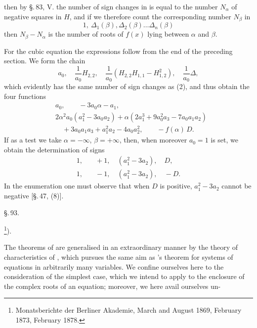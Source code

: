 
then by \S.\,83, V. the number of sign changes in
is equal to the number $N_\alpha$ of negative squares in $H$, and if we therefore count the corresponding number $N_\beta$ in
\[
1,\ \varDelta_1(\beta), \varDelta_2(\beta) \dots \varDelta_n(\beta)
\]
then $N_\beta - N_\alpha$ is the number of roots of $f(x)$ lying between $\alpha$ and $\beta$.

For the cubic equation the expressions follow from the end of the preceding section. We form the chain
\[
a_0,\quad \frac{1}{a_0} H_{2,2},\quad \frac{1}{a_0}\left(H_{2,2} H_{1,1} - H_{1,2}^2\right),\quad \frac{1}{a_0} \varDelta,
\]
which evidently has the same number of sign changes as (2), and thus obtain the four functions
\[
\begin{aligned}
&a_0,\qquad -3 a_0 \alpha - a_1,\\
&2\alpha^2 a_0(a_1^2 - 3a_0 a_2) + \alpha(2a_1^3 + 9a_0^2a_3 - 7a_0a_1a_2)\\
&\quad + 3a_0a_1a_3 + a_1^2a_2 - 4a_0a_2^2,\qquad -f(\alpha)\,D.
\end{aligned}
\]
If as a test we take $\alpha = -\infty$, $\beta = +\infty$, then, when moreover $a_0 = 1$ is set, we obtain the determination of signs
\[
\begin{aligned}
1, &\quad +1, \quad (a_1^2 - 3a_2), \quad D,\\
1, &\quad -1, \quad (a_1^2 - 3a_2), \quad -D.
\end{aligned}
\]
In the enumeration one must observe that when $D$ is positive, $a_1^2 - 3a_2$ cannot be negative [\S.\,47, (8)].

\begin{center}
\S.\,93.

\footnote{Monatsberichte der Berliner Akademie, March and August 1869, February 1873, February 1878.}).
\end{center}

The theorems of  are generalised in an extraordinary manner by the theory of characteristics of , which pursues the same aim as 's theorem for systems of equations in arbitrarily many variables. We confine ourselves here to the consideration of the simplest case, which we intend to apply to the enclosure of the complex roots of an equation; moreover, we here avail ourselves un-
